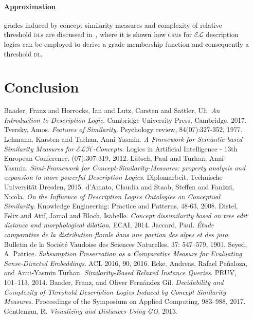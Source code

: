 \documentclass[]{llncs}
\theoremstyle{remark}
\newcommand{\el}{\(\mathcal{EL}{}\)}
\newcommand{\elh}{\(\mathcal{ELH}{}\)}
\newcommand{\dl}{\textsc{dl}}
\newcommand{\csm}{\textsc{csm}}
\begin{document}
  \paragraph{Approximation} grades induced by concept similarity measures and complexity of relative threshold \dl{}s are discussed in~\cite{Ba17}, where it is shown how \csm{}s for \el{} description logics can be employed to derive a grade membership function and consequently a threshold \dl.

  \section{Conclusion}

  \begin{thebibliography}{1}
      Baader, Franz and Horrocks, Ian and Lutz, Carsten and Sattler, Uli.
      \textit{An Introduction to Description Logic}.
      Cambridge University Press, Cambridge, 2017.
      Tversky, Amos.
      \textit{Features of Similarity}.
      Psychology review, 84(07):327-352, 1977.
      Lehmann, Karsten and Turhan, Anni-Yasmin.
      \textit{A Framework for Semantic-based Similarity Measures for \elh-Concepts}.
      Logics in Artificial Intelligence - 13th European Conference, (07):307-319, 2012.
      Lätsch, Paul and Turhan, Anni-Yasmin.
      \textit{Simi-Framework for Concept-Similarity-Measures: property analysis and expansion to more powerful Description Logics}.
      Diplomarbeit, Technische Universität Dresden, 2015.
      d’Amato, Claudia and Staab, Steffen and Fanizzi, Nicola.
      \textit{On the Influence of Description Logics Ontologies on Conceptual Similarity}.
      Knowledge Engineering: Practice and Patterns, 48-63, 2008.
      Distel, Felix and Atif, Jamal and Bloch, Isabelle.
      \textit{Concept dissimilarity based on tree edit  distance and morphological dilation}.
      ECAI, 2014.
      Jaccard, Paul.
      \textit{\'Etude comparative de la distribution florale dans une portion des alpes et des jura}.
      Bulletin de la Société Vaudoise des Sciences Naturelles, 37: 547–579, 1901.
      Seyed, A. Patrice.
      \textit{Subsumption Preservation as a Comparative Measure for Evaluating Sense-Directed Embeddings}.
      ACL 2016, 90, 2016.
    Ecke, Andreas, Rafael Peñaloza, and Anni-Yasmin Turhan.
    \textit{Similarity-Based Relaxed Instance Queries}.
    PRUV, 101–113, 2014.
    Baader, Franz, and Oliver Fernández Gil.
    \textit{Decidability and Complexity of Threshold Description Logics Induced by Concept Similarity Measures}.
    Proceedings of the Symposium on Applied Computing, 983–988, 2017.
    Gentleman, R.
    \textit{Visualizing and Distances Using GO}.
    2013.%
  \end{thebibliography}
\end{document}
